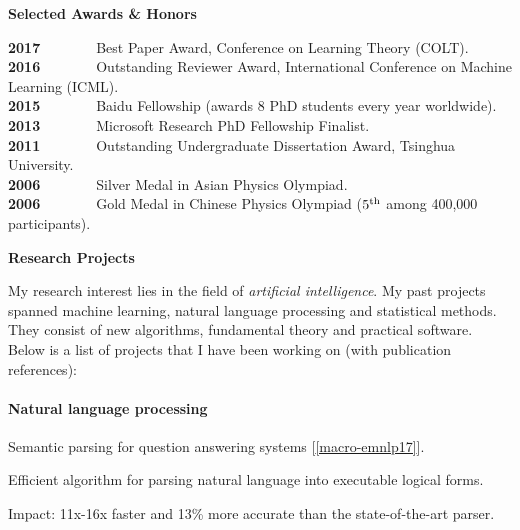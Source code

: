 \documentclass{res}
\newenvironment{my_item}{
\begin{itemize}
  \setlength{\itemsep}{0pt}
  \setlength{\parskip}{0pt}
  \setlength{\parsep}{0pt}}
{\end{itemize}
}
\begin{document}
\begin{resume}
{\Large\bf Selected Awards \& Honors}

\vspace{-5pt}
\textbf{2017}~~~~~~~~Best Paper Award, Conference on Learning Theory (COLT).\\
\textbf{2016}~~~~~~~~Outstanding Reviewer Award, International Conference on Machine Learning (ICML).\\
\textbf{2015}~~~~~~~~Baidu Fellowship (awards 8 PhD students every year worldwide).\\
\textbf{2013}~~~~~~~~Microsoft Research PhD Fellowship Finalist.\\
\textbf{2011}~~~~~~~~Outstanding Undergraduate Dissertation Award, Tsinghua University.\\
\textbf{2006}~~~~~~~~Silver Medal in Asian Physics Olympiad.\\
\textbf{2006}~~~~~~~~Gold Medal in Chinese Physics Olympiad ($5^{\rm{th}}$ among 400,000 participants).

{\bf\Large Research Projects}

My research interest lies in the field of \emph{artificial intelligence}. My past projects spanned machine learning, natural language processing and statistical methods. They consist of new algorithms, fundamental theory and practical software. Below is a list of projects that I have been working on (with publication references):

\vspace{-10pt}
\paragraph{Natural language processing}
\begin{my_item}
\item Semantic parsing for question answering systems [\ref{macro-emnlp17}].
\begin{my_item}
\item Efficient algorithm for parsing natural language into executable logical forms.
\item Impact: 11x-16x faster and 13\% more accurate than the state-of-the-art parser.
\end{my_item}
\end{my_item}

\vspace{-10pt}

\end{resume}
\end{document}
